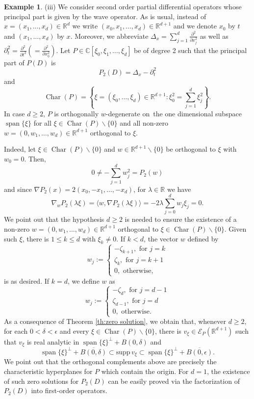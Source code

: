 \documentclass[a4paper,10pt]{amsart}
\newtheorem*{crucial lemma}{Lemma \ref{lem:nice polynomial2}}
\theoremstyle{definition}
\newtheorem{example}[theorem]{Example}
\newcommand{\R}{\mathbb{R}}
\newcommand{\C}{\mathbb{C}}
\newcommand{\supp}{\mbox{supp}\,}
\newcommand{\charcone}{\operatorname{Char}}
\newcommand{\wniceon}[2]{$#1$-degenerate on~#2}
\begin{document}
\begin{example}
    (iii) We consider second order partial differential operators whose principal part is given by the wave operator. As is usual, instead of $x=(x_1,\ldots,x_d)\in\R^d$ we write $(x_0,x_1,\ldots,x_d)\in\R^{d+1}$ and we denote $x_0$ by $t$ and $(x_1,\ldots,x_d)$ by $x$. Moreover, we abbreviate $\Delta_x=\sum_{j=1}^d\frac{\partial^2}{\partial x_j^2}$ as well as $\partial^2_t=\frac{\partial^2}{\partial t^2}(=\frac{\partial^2}{\partial x_0^2})$. Let $P\in\C[\xi_0,\xi_1,\ldots,\xi_d]$ be of degree 2 such that the principal part of $P(D)$ is \[P_2(D)=\Delta_x-\partial_t^2\]
    and
    \[\charcone(P)=\left\{\xi=(\xi_0,\ldots,\xi_d)\in\R^{d+1}\colon \xi_0^2=\sum_{j=1}^d\xi_j^2\right\}.\]
    In case $d\geq 2$, $P$ is orthogonally \wniceon{w}{the one dimensional subspace $\operatorname{span}\{\xi\}$} for all $\xi\in \charcone(P)\backslash\{0\}$ and all non-zero $w=(0,w_1,\ldots,w_d)\in\R^{d+1}$ orthogonal to $\xi$.

    Indeed, let $\xi\in \charcone(P)\backslash\{0\}$ and $w\in\R^{d+1}\backslash\{0\}$ be orthogonal to $\xi$ with $w_0=0$. Then,
    \[0\neq -\sum_{j=1}^d w_j^2=P_2(w)\]
    and since $\nabla P_2(x)=2(x_0,-x_1,\ldots,-x_d)$, for $\lambda\in\R$ we have
    \[\nabla_w P_2(\lambda\xi)=\langle w,\nabla P_2(\lambda\xi)\rangle=-2\lambda\sum_{j=0}^dw_j\xi_j=0.\]
    We point out that the hypothesis $d\geq 2$ is needed to ensure the existence of a non-zero $w=(0,w_1,\ldots,w_d)\in\R^{d+1}$ orthogonal to $\xi\in \charcone(P)\backslash\{0\}$. Given such $\xi$, there is $1\leq k\leq d$ with $\xi_k\neq 0$. If $k<d$, the vector $w$ defined by
    \[
    w_j:=
    \begin{cases}
    -\zeta_{k+1}, \text{ for } j=k\\ 
    \zeta_{k}, \text{ for } j=k+1\\
    0, \text{ otherwise},
    \end{cases}
    \]
    is as desired. If $k=d$, we define $w$ as
    \[
    w_j:=
    \begin{cases}
    -\zeta_{d}, \text{ for } j=d-1\\ 
    \zeta_{d-1}, \text{ for } j=d\\
    0, \text{ otherwise}.
    \end{cases}
    \]
    As a consequence of Theorem \ref{th:zero solution}, we obtain that, whenever $d\geq 2$, for each $0<\delta<\epsilon$ and every $\xi\in \charcone(P)\backslash\{0\}$, there is $v_\xi\in\mathscr{E}_P(\R^{d+1})$ such that $v_\xi$ is real analytic in $\operatorname{span}\{\xi\}^\perp +B(0,\delta)$ and
    \[\operatorname{span}\{\xi\}^\perp +\overline{B(0,\delta)}\subset\supp v_\xi\subset \operatorname{span}\{\xi\}^\perp +\overline{B(0,\epsilon)}.\]
    We point out that the orthogonal complements above are precisely the characteristic hyperplanes for $P$ which contain the origin. For $d=1$, the existence of such zero solutions for $P_2(D)$ can be easily proved via the factorization of $P_2(D)$ into first-order operators.
\end{example}
\end{document}

